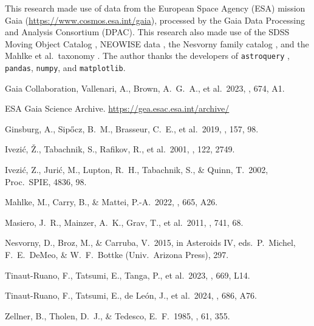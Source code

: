 \documentclass[modern]{aastex631}
\begin{document}
\begin{acknowledgments}
This research made use of data from the European Space Agency
(ESA) mission Gaia (\url{https://www.cosmos.esa.int/gaia}),
processed by the Gaia Data Processing and Analysis Consortium
(DPAC). This research also made use of the SDSS Moving Object
Catalog \citep{Ivezic2001}, NEOWISE data \citep{Masiero2011},
the Nesvorny family catalog \citep{Nesvorny2015}, and the
Mahlke et al.\ taxonomy \citep{Mahlke2022}. The author thanks
the developers of \texttt{astroquery} \citep{Ginsburg2019},
\texttt{pandas}, \texttt{numpy}, and \texttt{matplotlib}.
\end{acknowledgments}

\begin{thebibliography}{}

Gaia Collaboration, Vallenari, A., Brown, A.~G.~A., et al.\ 2023,
\aap, 674, A1.

ESA Gaia Science Archive. \url{https://gea.esac.esa.int/archive/}

Ginsburg, A., Sip{\H o}cz, B.~M., Brasseur, C.~E., et al.\ 2019,
\aj, 157, 98.

Ivezi{\'c}, {\v Z}., Tabachnik, S., Rafikov, R., et al.\ 2001,
\aj, 122, 2749.

Ivezi{\'c}, Z., Juri{\'c}, M., Lupton, R.~H., Tabachnik, S.,
\& Quinn, T.\ 2002, Proc.\ SPIE, 4836, 98.

Mahlke, M., Carry, B., \& Mattei, P.-A.\ 2022,
\aap, 665, A26.

Masiero, J.~R., Mainzer, A.~K., Grav, T., et al.\ 2011,
\apj, 741, 68.

Nesvorny, D., Broz, M., \& Carruba, V.\ 2015,
in Asteroids IV, eds.\ P.\ Michel, F.~E.\ DeMeo,
\& W.~F.\ Bottke (Univ.\ Arizona Press), 297.

Tinaut-Ruano, F., Tatsumi, E., Tanga, P., et al.\ 2023,
\aap, 669, L14.

Tinaut-Ruano, F., Tatsumi, E., de Le{\'o}n, J., et al.\ 2024,
\aap, 686, A76.

Zellner, B., Tholen, D.~J., \& Tedesco, E.~F.\ 1985,
\icarus, 61, 355.

\end{thebibliography}
\end{document}
